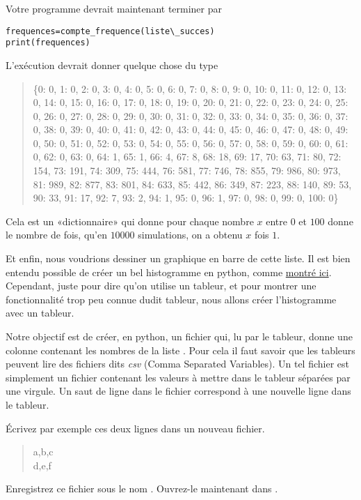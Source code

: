 Votre programme devrait maintenant terminer par
\begin{verbatim}
frequences=compte_frequence(liste\_succes)
print(frequences)
\end{verbatim}

L'exécution devrait donner quelque chose du type
\begin{quote}
\{0: 0, 1: 0, 2: 0, 3: 0, 4: 0, 5: 0, 6: 0, 7: 0, 8: 0, 9: 0, 10: 0, 11: 0, 12: 0, 13: 0, 14: 0, 15: 0, 16: 0, 17: 0, 18: 0, 19: 0, 20: 0, 21: 0, 22: 0, 23: 0, 24: 0, 25: 0, 26: 0, 27: 0, 28: 0, 29: 0, 30: 0, 31: 0, 32: 0, 33: 0, 34: 0, 35: 0, 36: 0, 37: 0, 38: 0, 39: 0, 40: 0, 41: 0, 42: 0, 43: 0, 44: 0, 45: 0, 46: 0, 47: 0, 48: 0, 49: 0, 50: 0, 51: 0, 52: 0, 53: 0, 54: 0, 55: 0, 56: 0, 57: 0, 58: 0, 59: 0, 60: 0, 61: 0, 62: 0, 63: 0, 64: 1, 65: 1, 66: 4, 67: 8, 68: 18, 69: 17, 70: 63, 71: 80, 72: 154, 73: 191, 74: 309, 75: 444, 76: 581, 77: 746, 78: 855, 79: 986, 80: 973, 81: 989, 82: 877, 83: 801, 84: 633, 85: 442, 86: 349, 87: 223, 88: 140, 89: 53, 90: 33, 91: 17, 92: 7, 93: 2, 94: 1, 95: 0, 96: 1, 97: 0, 98: 0, 99: 0, 100: 0\}
\end{quote}
Cela est un «dictionnaire» qui donne pour chaque nombre \( x\) entre \( 0\) et \( 100\) donne le nombre de fois, qu'en $10000$ simulations, on a obtenu \( x\) fois \( 1\). 

Et enfin, nous voudrions dessiner un graphique en barre de cette liste. Il est bien entendu possible de créer un bel histogramme en python, comme \href{http://matplotlib.org/users/screenshots.html}{montré ici}. Cependant, juste pour dire qu'on utilise un tableur, et pour montrer une fonctionnalité trop peu connue dudit tableur, nous allons créer l'histogramme avec un tableur.

Notre objectif est de créer, en python, un fichier qui, lu par le tableur, donne une colonne contenant les nombres de la liste . Pour cela il faut savoir que les tableurs peuvent lire des fichiers dits \emph{csv} (Comma Separated Variables). Un tel fichier est simplement un fichier contenant les valeurs à mettre dans le tableur séparées par une virgule. Un saut de ligne dans le fichier correspond à une nouvelle ligne dans le tableur.

Écrivez par exemple ces deux lignes dans un nouveau fichier.
\begin{quote}
    a,b,c\\
    d,e,f
\end{quote}
Enregistrez ce fichier sous le nom . Ouvrez-le maintenant dans .

